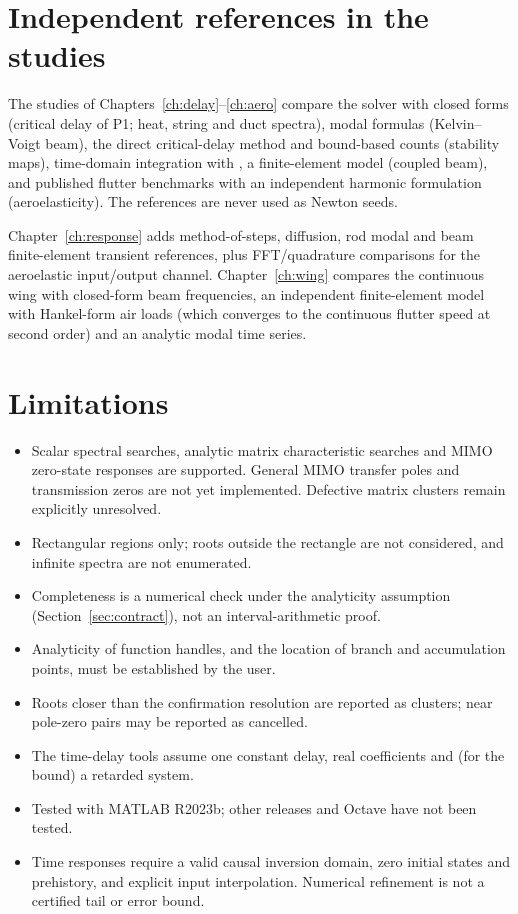 \section{Independent references in the studies}

The studies of Chapters~\ref{ch:delay}--\ref{ch:aero} compare the solver
with closed forms (critical delay of P1; heat, string and duct spectra),
modal formulas (Kelvin--Voigt beam), the direct critical-delay method and
bound-based counts (stability maps), time-domain integration with
, a finite-element model (coupled beam), and published flutter
benchmarks with an independent harmonic formulation (aeroelasticity). The references are
never used as Newton seeds.

Chapter~\ref{ch:response} adds method-of-steps, diffusion, rod modal and
beam finite-element transient references, plus FFT/quadrature comparisons
for the aeroelastic input/output channel. Chapter~\ref{ch:wing} compares
the continuous wing with closed-form beam frequencies, an independent
finite-element model with Hankel-form air loads (which converges to the
continuous flutter speed at second order) and an analytic modal time
series.

\section{Limitations}

\begin{itemize}
  \item Scalar spectral searches, analytic matrix characteristic searches
        and MIMO zero-state responses are supported. General MIMO transfer
        poles and transmission zeros are not yet implemented. Defective
        matrix clusters remain explicitly unresolved.
  \item Rectangular regions only; roots outside the rectangle are not
        considered, and infinite spectra are not enumerated.
  \item Completeness is a numerical check under the analyticity assumption
        (Section~\ref{sec:contract}), not an interval-arithmetic proof.
  \item Analyticity of function handles, and the location of branch and
        accumulation points, must be established by the user.
  \item Roots closer than the confirmation resolution are reported as
        clusters; near pole-zero pairs may be reported as cancelled.
  \item The time-delay tools assume one constant delay, real coefficients
        and (for the bound) a retarded system.
  \item Tested with MATLAB R2023b; other releases and Octave have not been
        tested.
  \item Time responses require a valid causal inversion domain, zero
        initial states and prehistory, and explicit input interpolation.
        Numerical refinement is not a certified tail or error bound.
\end{itemize}
